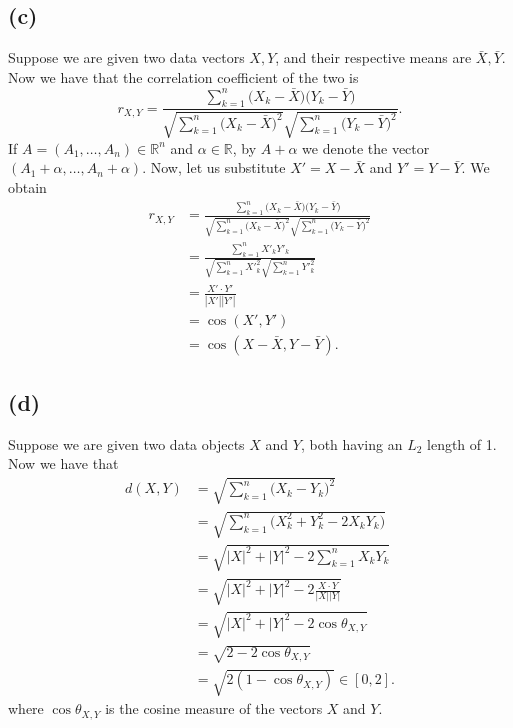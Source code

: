 \documentclass[10pt]{article}
\begin{document}
\subsection*{(c)}
Suppose we are given two data vectors $X, Y$, and their respective means are $\bar{X}, \bar{Y}$.
Now we have that the correlation coefficient of the two is 
\[
r_{X, Y} = \frac{\sum_{k = 1}^n \big( X_k - \bar{X} \big) \big( Y_k - \bar{Y} \big)}{ \sqrt{ \sum_{ k = 1 }^n \big(X_k - \bar{X} \big)^2 } \sqrt{ \sum_{k = 1}^n \big(Y_k - \bar{Y} \big)^2 } }.
\]
If $A = (A_1, \dots, A_n) \in \mathbb{R}^n$ and $\alpha \in \mathbb{R}$, by $A + \alpha$ we denote the vector $(A_1 + \alpha, \dots, A_n + \alpha)$. Now, let us substitute $X' = X - \bar{X}$ and $Y' = Y - \bar{Y}$. We obtain
\begin{align*}
r_{X, Y} &= \frac{\sum_{k = 1}^n \big( X_k - \bar{X} \big) \big( Y_k - \bar{Y} \big)}{ \sqrt{ \sum_{ k = 1 }^n \big(X_k - \bar{X} \big)^2 } \sqrt{ \sum_{k = 1}^n \big(Y_k - \bar{Y} \big)^2 } } \\
            &= \frac{ \sum_{k = 1}^n X'_k Y'_k }{ \sqrt{ \sum_{k = 1}^n {X'}_k^2 }  \sqrt{ \sum_{k = 1}^n {Y'}_{k}^2} } \\
            &= \frac{ X' \cdot Y' }{ |X'| |Y'| } \\
            &= \cos(X', Y') \\
            &= \cos(X - \bar{X}, Y - \bar{Y}).
\end{align*}
 
\subsection*{(d)}
Suppose we are given two data objects $X$ and $Y$, both having an $L_2$ length of 1. Now we have that
\begin{align*}
d(X, Y) &= \sqrt{\sum_{k = 1}^n \bigg( X_k - Y_k \bigg)^2} \\
           &= \sqrt{\sum_{k = 1}^n \bigg( X_k^2 + Y_k^2 - 2X_kY_k \bigg)} \\
           &= \sqrt{|X|^2 + |Y|^2 - 2 \sum_{k = 1}^n X_kY_k} \\
           &= \sqrt{|X|^2 + |Y|^2 - 2 \frac{X \cdot Y}{|X||Y|}} \\
           &= \sqrt{|X|^2 + |Y|^2 - 2 \cos \theta_{X,Y}} \\
           &= \sqrt{2 - 2 \cos \theta_{X,Y}} \\
           &= \sqrt{2(1 - \cos \theta_{X,Y})} \in [0, 2].        
\end{align*}
where $\cos \theta_{X,Y}$ is the cosine measure of the vectors $X$ and $Y$.
\end{document}
